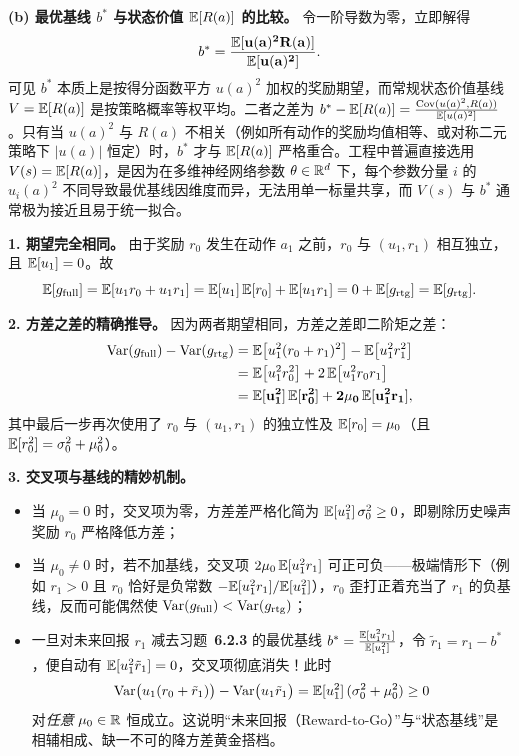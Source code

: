 \textbf{(b) 最优基线 $b^*$ 与状态价值 $\mathbb{E}[R(a)]$ 的比较。} 令一阶导数为零，立即解得
\[
  b^* = \mathbf{\frac{\mathbb{E}[u(a)^2 R(a)]}{\mathbb{E}[u(a)^2]}}.
\]
可见 $b^*$ 本质上是按得分函数平方 $u(a)^2$ 加权的奖励期望，而常规状态价值基线 $V = \mathbb{E}[R(a)]$ 是按策略概率等权平均。二者之差为 $b^* - \mathbb{E}[R(a)] = \frac{\operatorname{Cov}(u(a)^2, R(a))}{\mathbb{E}[u(a)^2]}$。只有当 $u(a)^2$ 与 $R(a)$ 不相关（例如所有动作的奖励均值相等、或对称二元策略下 $|u(a)|$ 恒定）时，$b^*$ 才与 $\mathbb{E}[R(a)]$ 严格重合。工程中普遍直接选用 $V(s) = \mathbb{E}[R(a)]$，是因为在多维神经网络参数 $\theta \in \mathbb{R}^d$ 下，每个参数分量 $i$ 的 $u_i(a)^2$ 不同导致最优基线因维度而异，无法用单一标量共享，而 $V(s)$ 与 $b^*$ 通常极为接近且易于统一拟合。


\textbf{1. 期望完全相同。} 由于奖励 $r_0$ 发生在动作 $a_1$ 之前，$r_0$ 与 $(u_1, r_1)$ 相互独立，且 $\mathbb{E}[u_1] = 0$。故
\[
  \mathbb{E}[g_{\mathrm{full}}] = \mathbb{E}[u_1 r_0 + u_1 r_1] = \mathbb{E}[u_1]\,\mathbb{E}[r_0] + \mathbb{E}[u_1 r_1] = 0 + \mathbb{E}[g_{\mathrm{rtg}}] = \mathbb{E}[g_{\mathrm{rtg}}].
\]

\textbf{2. 方差之差的精确推导。} 因为两者期望相同，方差之差即二阶矩之差：
\begin{align*}
  \operatorname{Var}(g_{\mathrm{full}}) - \operatorname{Var}(g_{\mathrm{rtg}})
  &= \mathbb{E}\!\left[u_1^2 (r_0 + r_1)^2\right] - \mathbb{E}\!\left[u_1^2 r_1^2\right] \\
  &= \mathbb{E}\!\left[u_1^2 r_0^2\right] + 2\,\mathbb{E}\!\left[u_1^2 r_0 r_1\right] \\
  &= \mathbf{\mathbb{E}[u_1^2]\,\mathbb{E}[r_0^2] + 2\mu_0\,\mathbb{E}[u_1^2 r_1]},
\end{align*}
其中最后一步再次使用了 $r_0$ 与 $(u_1, r_1)$ 的独立性及 $\mathbb{E}[r_0] = \mu_0$（且 $\mathbb{E}[r_0^2] = \sigma_0^2 + \mu_0^2$）。

\textbf{3. 交叉项与基线的精妙机制。}
\begin{itemize}
  \item 当 $\mu_0 = 0$ 时，交叉项为零，方差差严格化简为 $\mathbb{E}[u_1^2]\,\sigma_0^2 \ge 0$，即剔除历史噪声奖励 $r_0$ 严格降低方差；
  \item 当 $\mu_0 \neq 0$ 时，若不加基线，交叉项 $2\mu_0\,\mathbb{E}[u_1^2 r_1]$ 可正可负——极端情形下（例如 $r_1 > 0$ 且 $r_0$ 恰好是负常数 $-\mathbb{E}[u_1^2 r_1]/\mathbb{E}[u_1^2]$），$r_0$ 歪打正着充当了 $r_1$ 的负基线，反而可能偶然使 $\operatorname{Var}(g_{\mathrm{full}}) < \operatorname{Var}(g_{\mathrm{rtg}})$；
  \item 一旦对未来回报 $r_1$ 减去习题~\textbf{6.2.3} 的最优基线 $b^* = \frac{\mathbb{E}[u_1^2 r_1]}{\mathbb{E}[u_1^2]}$，令 $\tilde{r}_1 = r_1 - b^*$，便自动有 $\mathbb{E}[u_1^2 \tilde{r}_1] = 0$，交叉项彻底消失！此时
  \[
    \operatorname{Var}\!\big(u_1(r_0 + \tilde{r}_1)\big) - \operatorname{Var}\!\big(u_1 \tilde{r}_1\big) = \mathbb{E}[u_1^2]\,(\sigma_0^2 + \mu_0^2) \ge 0
  \]
  对\emph{任意} $\mu_0 \in \mathbb{R}$ 恒成立。这说明“未来回报（Reward-to-Go）”与“状态基线”是相辅相成、缺一不可的降方差黄金搭档。
\end{itemize}

